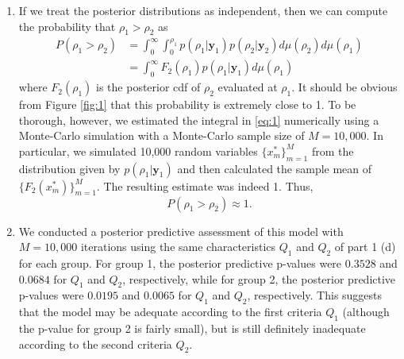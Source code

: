 \documentclass[12pt]{article}
\begin{document}
\begin{enumerate}[leftmargin=*]
\begin{enumerate}[leftmargin=1mm]
      \item If we treat the posterior distributions as independent, then we can compute the probability that $\rho_1 > \rho_2$ as
        \begin{align}
          P(\rho_1 > \rho_2) & = \int_{0}^{\infty}\int_{0}^{\rho_1}p(\rho_1|\bm{y}_1)p(\rho_2|\bm{y}_2) d\mu(\rho_2)d\mu(\rho_1) \nonumber \\
          & = \int_{0}^{\infty} F_{2}(\rho_1)p(\rho_1|\bm{y}_1) d\mu(\rho_1) \label{eq:1}
        \end{align}
        where $F_{2}(\rho_1)$ is the posterior cdf of $\rho_2$ evaluated at $\rho_1$.
        It should be obvious from Figure \ref{fig:1} that this probability is extremely close to 1. To be thorough, however, we estimated the integral
        in \eqref{eq:1}
        numerically using a 
        Monte-Carlo simulation with a Monte-Carlo sample size of $M = 10,000$. 
        In particular, we simulated 10,000 random variables $\{x_{m}^{*}\}_{m=1}^{M}$ from the distribution given by $p(\rho_1|\bm{y}_1)$ and 
        then calculated the sample mean of $\{F_{2}(x_{m}^{*})\}_{m=1}^{M}$. The resulting estimate was indeed 1. Thus,
        \[
          P(\rho_1 > \rho_2) \approx 1.
        \]

      \item We conducted a posterior predictive assessment of this model with $M = 10,000$ iterations 
        using the same characteristics $Q_1$ and $Q_2$ of part 1 (d) for each group. For group 1, the posterior predictive p-values 
        were $0.3528$ and $0.0684$ for $Q_1$ and $Q_2$, respectively, while for group 2, the posterior predictive p-values were
        $0.0195$ and $0.0065$ for $Q_1$ and $Q_2$, respectively. This suggests that the model may be adequate according to the first criteria $Q_1$
        (although the p-value for group 2 is fairly small), but
        is still definitely inadequate according to the second criteria $Q_2$.


\end{enumerate}
\end{enumerate}
\end{document}
